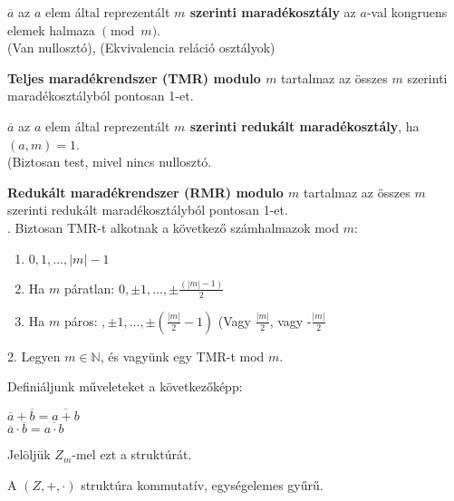 \begin{frame}
  \begin{tcolorbox}[title={Def.: TMR, RMR}]
    $\overline{a}$ az $a$ elem által reprezentált \textbf{$m$ szerinti maradékosztály} az $a$-val kongruens elemek halmaza $\pmod{m}$.\\
    {\footnotesize (Van nullosztó), (Ekvivalencia reláció osztályok)}
    \mmedskip

    \textbf{Teljes maradékrendszer (TMR) modulo $m$} tartalmaz az összes $m$ szerinti maradékosztályból pontosan 1-et.\\
    \mmedskip

    $\overline{a}$ az $a$ elem által reprezentált \textbf{$m$ szerinti redukált maradékosztály}, ha $(a, m) = 1$.\\
    {\footnotesize (Biztosan test, mivel nincs nullosztó.}\\
    \mmedskip

    \textbf{Redukált maradékrendszer (RMR) modulo $m$} tartalmaz az összes $m$ szerinti redukált maradékosztályból pontosan 1-et.\\
  . Biztosan TMR-t alkotnak a következő számhalmazok mod $m$:\\
    \begin{enumerate}
      \item $0, 1, ..., |m| - 1$
      \item Ha $m$ páratlan: $0, {\pm}1, ..., {\pm}\frac{(|m| - 1)}{2}$
      \item Ha $m$ páros: $ , {\pm}1, ..., {\pm}(\frac{|m|}{2} - 1)$ (Vagy $\frac{|m|}{2}$, vagy -$\frac{|m|}{2}$
    \end{enumerate}
    \mmedskip

    2. Legyen $m \in \mathbb{N}$, és vagyünk egy TMR-t mod $m$.\\
    \msmallskip
    
    Definiáljunk műveleteket a következőképp:\\
    \mtinyskip
    
    $\overline{a} + \overline{b} = \overline{a + b}$\\
    $\overline{a} \cdot \overline{b} = \overline{a \cdot b}$\\
    \mtinyskip
    
    Jelöljük $Z_m$-mel ezt a struktúrát.\\
    \mtinyskip

    A $(Z, +, {\cdot})$ struktúra kommutatív, egységelemes gyűrű.
  \end{tcolorbox}
\end{frame}

